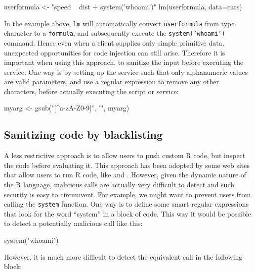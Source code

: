 \documentclass{jss}
\newcommand{\R}{\textsf{R}\xspace}
\begin{document}
\begin{CodeChunk}
\begin{CodeInput}
userformula <- "speed ~ dist + system('whoami')"
lm(userformula, data=cars)
\end{CodeInput}
\end{CodeChunk}

In the example above, \texttt{lm} will automatically convert
\texttt{userformula} from type character to a \texttt{formula}, and subsequently
execute the \texttt{system('whoami')} command. Hence even when a client supplies
only simple primitive data, unexpected opportunities for code injection can
still arise. Therefore it is important when using this approach, to sanitize the
input before executing the service. One way is by setting up the service such
that only alphanumeric values are valid parameters, and use a regular
expression to remove any other characters, before actually executing the script
or service:
\begin{CodeChunk}
\begin{CodeInput}
myarg <- gsub("[^a-zA-Z0-9]", "", myarg)
\end{CodeInput}
\end{CodeChunk}


\subsection{Sanitizing code by blacklisting}

A less restrictive approach is to allow users to push custom \R code, but
inspect the code before evaluating it. This approach has been adopted by some
web sites that allow users to run \R code, like \cite{banfield1999rweb} and
\cite{cloudstat}. However, given the dynamic nature of the \R language,
malicious calls are actually very difficult to detect and such security is easy
to circumvent. For example, we might want to prevent users from calling the
\texttt{system} function. One way is to define some smart regular expressions
that look for the word ``system'' in a block of code. This way it would be
possible to detect a potentially malicious call like this:

\begin{CodeChunk}
\begin{CodeInput}
system("whoami")
\end{CodeInput}
\end{CodeChunk}

However, it is much more difficult to detect the equivalent call in the following
block:
\end{document}
